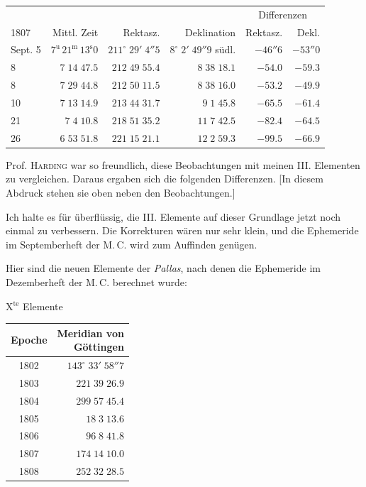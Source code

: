 \begin{center}\fontsize{9}{11}\selectfont\setlength{\tabcolsep}{2pt}\renewcommand{\arraystretch}{1.15}\begin{tabular}{lrrrrr}
& & & & \multicolumn{2}{c}{Differenzen}\\
1807 & Mittl. Zeit & Rektasz. & Deklination & Rektasz. & Dekl.\\\hline
Sept. 5 & $7^{\text{u}}\,21^{\text{m}}\,13^{\text{s}}0$ & $211^\circ\;29'\;4''5$ & $8^\circ\;2'\;49''9$ südl. & $-46''6$ & $-53''0$\\
8 & $7\;14\;47.5$ & $212\;49\;55.4$ & $8\;38\;18.1$ & $-54.0$ & $-59.3$\\
8 & $7\;29\;44.8$ & $212\;50\;11.5$ & $8\;38\;16.0$ & $-53.2$ & $-49.9$\\
10 & $7\;13\;14.9$ & $213\;44\;31.7$ & $9\;1\;45.8$ & $-65.5$ & $-61.4$\\
21 & $7\;4\;10.8$ & $218\;51\;35.2$ & $11\;7\;42.5$ & $-82.4$ & $-64.5$\\
26 & $6\;53\;51.8$ & $221\;15\;21.1$ & $12\;2\;59.3$ & $-99.5$ & $-66.9$\\
\end{tabular}\end{center}

\par\indent Prof. \textsc{Harding} war so freundlich, diese Beobachtungen mit meinen III. Elementen zu vergleichen. Daraus ergaben sich die folgenden Differenzen. [In diesem Abdruck stehen sie oben neben den Beobachtungen.]

\par\indent Ich halte es für überflüssig, die III. Elemente auf dieser Grundlage jetzt noch einmal zu verbessern. Die Korrekturen wären nur sehr klein, und die Ephemeride im Septemberheft der M.\,C. wird zum Auffinden genügen.

\par\indent Hier sind die neuen Elemente der \emph{Pallas}, nach denen die Ephemeride im Dezemberheft der M.\,C. berechnet wurde:

\begin{center}
X$^{\text{te}}$ Elemente
\end{center}


\begin{center}\fontsize{10}{12}\selectfont\setlength{\tabcolsep}{2pt}\renewcommand{\arraystretch}{1.15}\begin{tabular}{cr}
Epoche & \shortstack{Meridian von\\Göttingen}\\\hline
1802 & $143^\circ\;33'\;58''7$\\
1803 & $221\;39\;26.9$\\
1804 & $299\;57\;45.4$\\
1805 & $18\;3\;13.6$\\
1806 & $96\;8\;41.8$\\
1807 & $174\;14\;10.0$\\
1808 & $252\;32\;28.5$\\
\end{tabular}\end{center}

